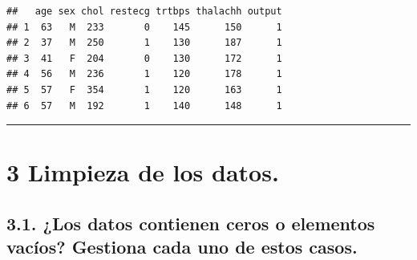 \documentclass[
]{article}
\newenvironment{Shaded}{\begin{snugshade}}{\end{snugshade}}
\newcommand{\FunctionTok}[1]{\textcolor[rgb]{0.13,0.29,0.53}{\textbf{#1}}}
\newcommand{\NormalTok}[1]{#1}
\newcommand{\OtherTok}[1]{\textcolor[rgb]{0.56,0.35,0.01}{#1}}
\newcommand{\SpecialCharTok}[1]{\textcolor[rgb]{0.81,0.36,0.00}{\textbf{#1}}}
\newcommand{\StringTok}[1]{\textcolor[rgb]{0.31,0.60,0.02}{#1}}
\begin{document}
\begin{Shaded}
\end{Shaded}

\begin{verbatim}
##   age sex chol restecg trtbps thalachh output
## 1  63   M  233       0    145      150      1
## 2  37   M  250       1    130      187      1
## 3  41   F  204       0    130      172      1
## 4  56   M  236       1    120      178      1
## 5  57   F  354       1    120      163      1
## 6  57   M  192       1    140      148      1
\end{verbatim}

\begin{center}\rule{0.5\linewidth}{0.5pt}\end{center}

\hypertarget{limpieza-de-los-datos.}{%
\section{3 Limpieza de los datos.}\label{limpieza-de-los-datos.}}

\hypertarget{los-datos-contienen-ceros-o-elementos-vacuxedos-gestiona-cada-uno-de-estos-casos.}{%
\subsection{3.1. ¿Los datos contienen ceros o elementos vacíos? Gestiona
cada uno de estos
casos.}\label{los-datos-contienen-ceros-o-elementos-vacuxedos-gestiona-cada-uno-de-estos-casos.}}
\end{document}
